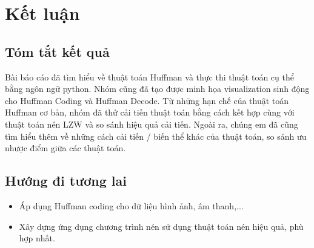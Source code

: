 \chapter{Kết luận}
\section{Tóm tắt kết quả} 
Bài báo cáo đã tìm hiểu về thuật toán Huffman và thực thi thuật toán cụ thể bằng ngôn ngữ python. Nhóm cũng đã tạo được minh họa visualization sinh động cho Huffman Coding và Huffman Decode. Từ những hạn chế của thuật toán Huffman cơ bản, nhóm đã thử cải tiến thuật toán bằng cách kết hợp cùng với thuật toán nén LZW và so sánh hiệu quả cải tiến. Ngoài ra, chúng em đã cũng tìm hiểu thêm về những cách cải tiến / biến thể khác của thuật toán, so sánh ưu nhược điểm giữa các thuật toán.
\section{Hướng đi tương lai} 
\begin{itemize}
    \item Áp dụng Huffman coding cho dữ liệu hình ảnh, âm thanh,...
    \item Xây dựng ứng dụng chương trình nén sử dụng thuật toán nén hiệu quả, phù hợp nhất.
\end{itemize}